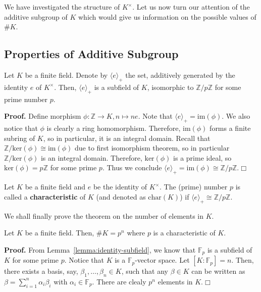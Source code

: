 \documentclass{template}
\newcommand{\qedwhite}{\hfill \ensuremath{\Box}}
\begin{document}
We have investigated the structure of $K^{\times}$. Let us now turn our
attention of the additive subgroup of $K$ which would give us information on the
possible values of $\#K$.

\subsection{Properties of Additive Subgroup}

\begin{lemma}\label{lemma:identity-subfield}
    Let $K$ be a finite field. Denote by $\langle e \rangle_+$ the set,
    additively generated by the identity $e$ of $K^{\times}$. Then, $\langle e
    \rangle_+$ is a subfield of $K$, isomorphic to $\mathbb{Z}/p\mathbb{Z}$ for
    some prime number $p$.
\end{lemma}

\textbf{Proof.} Define morphism $\phi: \mathbb{Z} \to K, n \mapsto ne$. Note
that $\langle e \rangle_+ = \text{im}(\phi)$. We also notice that $\phi$ is
clearly a ring homomorphism. Therefore, $\text{im}(\phi)$ forms a finite subring
of $K$, so in particular, it is an integral domain. Recall that
$\mathbb{Z}/\text{ker}(\phi) \cong \text{im}(\phi)$ due to first isomorphism
theorem, so in particular $\mathbb{Z}/\text{ker}(\phi)$ is an integral domain.
Therefore, $\text{ker}(\phi)$ is a prime ideal, so $\text{ker}(\phi) =
p\mathbb{Z}$ for some prime $p$. Thus we conclude $\langle e \rangle_+ =
\text{im}(\phi) \cong \mathbb{Z}/p\mathbb{Z}$.\qedwhite

\begin{definition}
    Let $K$ be a finite field and $e$ be the identity of $K^{\times}$. The (prime)
    number $p$ is called a \textbf{characteristic} of $K$ (and denoted as
    $\text{char}(K)$) if $\langle e \rangle_+ \cong \mathbb{Z}/p\mathbb{Z}$.
\end{definition}

We shall finally prove the theorem on the number of elements in $K$.
\begin{proposition}
    Let $K$ be a finite field. Then, $\#K = p^n$ where $p$ is a characteristic
    of $K$.
\end{proposition}

\textbf{Proof.} From Lemma~\ref{lemma:identity-subfield}, we know that
$\mathbb{F}_p$ is a subfield of $K$ for some prime $p$. Notice that $K$ is a
$\mathbb{F}_p$-vector space. Let $[K:\mathbb{F}_p]=n$. Then, there exists a
basis, say, $\beta_1,\dots,\beta_n \in K$, such that any $\beta \in K$ can be
written as $\beta = \sum_{i=1}^n \alpha_i\beta_i$ with $\alpha_i \in
\mathbb{F}_p$. There are clealy $p^n$ elements in $K$.\qedwhite
\end{document}
